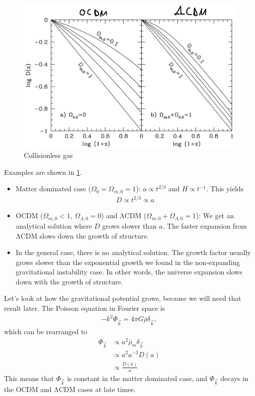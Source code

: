 \begin{figure}
	\centering
	\includegraphics[width=\textwidth]{img/ch-03/collisionless-gas.png}
	\caption{Collisionless gas}
	\label{fig:collisionless-gas}
\end{figure}

Examples are shown in \cref{fig:collisionless-gas}.
\begin{itemize}
	\item Matter dominated case ($\Omega_0 = \Omega_{m,0} = 1$): $a \propto t^{2/3}$ and $H \propto t^{-1}$. This yields
	\begin{align*}
		D \propto t^{2/3} \propto a
	\end{align*}
	\item OCDM ($\Omega_{m,0} < 1$, $\Omega_{\Lambda,0} = 0$) and ΛCDM ($\Omega_{m,0} + \Omega_{\Lambda,0} = 1$): We get an analytical solution where $D$ grows slower than $a$. The faster expansion from ΛCDM slows down the growth of structure.
	\item In the general case, there is no analytical solution. The growth factor usually grows slower than the exponential growth we found in the non-expanding gravitational instability case. In other words, the universe expansion slows down with the growth of structure.
\end{itemize}



Let's look at how the gravitational potential grows, because we will need that result later. The Poisson equation in Fourier space is
\begin{align*}
	- k^2 \Phi_{\vec{k}} = 4 \pi G \bar{\rho} \delta_{\vec{k}},
\end{align*}
which can be rearranged to
\begin{align*}
	\Phi_{\vec{k}}
	&\propto a^2 \bar{\rho}_m \delta_{\vec{k}}\\
	&\propto a^2 a^{-3} D(a) \\
	&\propto \frac{D(a)}{a}
\end{align*}
This means that $\Phi_{\vec{k}}$ is constant in the matter dominated case, and $\Phi_{\vec{k}}$ decays in the OCDM and ΛCDM cases at late times.


